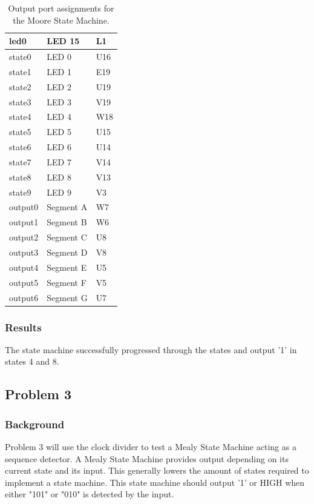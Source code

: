 \documentclass[11pt]{article}
\begin{document}
\begin{table}[H]
\begin{center}
\begin{tabular}{| l | l | l |}
	\hline
	led0 & LED 15 & L1 \\ \hline
	state0 & LED 0 & U16 \\ \hline
	state1 & LED 1 & E19 \\ \hline
	state2 & LED 2 & U19 \\ \hline
	state3 & LED 3 & V19 \\ \hline
	state4 & LED 4 & W18 \\ \hline
	state5 & LED 5 & U15 \\ \hline
	state6 & LED 6 & U14 \\ \hline
	state7 & LED 7 & V14 \\ \hline
	state8 & LED 8 & V13 \\ \hline
	state9 & LED 9 & V3 \\ \hline
	output0 & Segment A & W7 \\ \hline
	output1 & Segment B & W6 \\ \hline
	output2 & Segment C & U8 \\ \hline
	output3 & Segment D & V8 \\ \hline
	output4 & Segment E & U5 \\ \hline
	output5 & Segment F & V5 \\ \hline
	output6 & Segment G & U7 \\ \hline
\end{tabular}
\caption{\label{tab:moore_output_ports}Output port assignments for the Moore State Machine.}
\end{center}
\end{table}

\subsubsection{Results}
The state machine successfully progressed through the states and output '1' in states 4 and 8.

\subsection{Problem 3}

\subsubsection{Background}
Problem 3 will use the clock divider to test a Mealy State Machine acting as a sequence detector. A Mealy State Machine provides output depending on its current state and its input. This generally lowers the amount of states required to implement a state machine. This state machine should output '1' or HIGH when either "101" or "010" is detected by the input.
\end{document}
